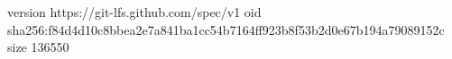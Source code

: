 version https://git-lfs.github.com/spec/v1
oid sha256:f84d4d10c8bbea2e7a841ba1cc54b7164ff923b8f53b2d0e67b194a79089152c
size 136550
